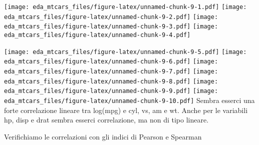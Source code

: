 \documentclass[
]{article}
\newenvironment{Shaded}{\begin{snugshade}}{\end{snugshade}}
\newcommand{\AttributeTok}[1]{\textcolor[rgb]{0.77,0.63,0.00}{#1}}
\newcommand{\ControlFlowTok}[1]{\textcolor[rgb]{0.13,0.29,0.53}{\textbf{#1}}}
\newcommand{\DecValTok}[1]{\textcolor[rgb]{0.00,0.00,0.81}{#1}}
\newcommand{\FunctionTok}[1]{\textcolor[rgb]{0.00,0.00,0.00}{#1}}
\newcommand{\NormalTok}[1]{#1}
\newcommand{\SpecialCharTok}[1]{\textcolor[rgb]{0.00,0.00,0.00}{#1}}
\begin{document}
\begin{Shaded}
\end{Shaded}

\texttt{[image: eda\_mtcars\_files/figure-latex/unnamed-chunk-9-1.pdf]}
\texttt{[image: eda\_mtcars\_files/figure-latex/unnamed-chunk-9-2.pdf]}
\texttt{[image: eda\_mtcars\_files/figure-latex/unnamed-chunk-9-3.pdf]}
\texttt{[image: eda\_mtcars\_files/figure-latex/unnamed-chunk-9-4.pdf]}

\begin{Shaded}
\end{Shaded}

\texttt{[image: eda\_mtcars\_files/figure-latex/unnamed-chunk-9-5.pdf]}
\texttt{[image: eda\_mtcars\_files/figure-latex/unnamed-chunk-9-6.pdf]}
\texttt{[image: eda\_mtcars\_files/figure-latex/unnamed-chunk-9-7.pdf]}
\texttt{[image: eda\_mtcars\_files/figure-latex/unnamed-chunk-9-8.pdf]}
\texttt{[image: eda\_mtcars\_files/figure-latex/unnamed-chunk-9-9.pdf]}
\texttt{[image: eda\_mtcars\_files/figure-latex/unnamed-chunk-9-10.pdf]}
Sembra esserci una forte correlazione lineare tra log(mpg) e cyl, vs, am
e wt. Anche per le variabili hp, disp e drat sembra esserci
correlazione, ma non di tipo lineare.

Verifichiamo le correlazioni con gli indici di Pearson e Spearman
\end{document}

